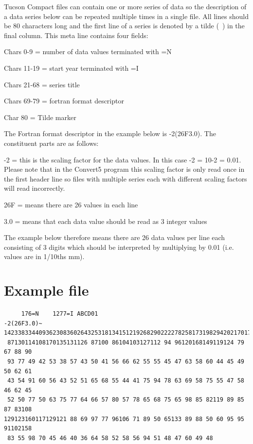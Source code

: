 Tucson Compact files can contain one or more series of data so the description of a data series below can be repeated multiple times in a single file. All lines should be 80 characters long and the first line of a series is denoted by a tilde (~) in the final column. This meta line contains four fields:

\begin{itemize*}
    \item  Chars 0-9 = number of data values terminated with =N
    \item  Chars 11-19 = start year terminated with =I
    \item  Chars 21-68 = series title
    \item  Chars 69-79 = fortran format descriptor
    \item  Char 80 = Tilde marker 
\end{itemize*}

The Fortran format descriptor in the example below is -2(26F3.0). The constituent parts are as follows:

\begin{itemize*}
    \item  -2 = this is the scaling factor for the data values. In this case -2 = 10-2 = 0.01. Please note that in the Convert5 program this scaling factor is only read once in the first header line so files with multiple series each with different scaling factors will read incorrectly. 
    \item  26F = means there are 26 values in each line
    \item  3.0 = means that each data value should be read as 3 integer values 
\end{itemize*}

The example below therefore means there are 26 data values per line each consisting of 3 digits which should be interpreted by multiplying by 0.01 (i.e. values are in 1/10ths mm). 


\section{Example file}
\begin{lstlisting}
     176=N    1277=I ABCD01                                          -2(26F3.0)~
142338334409362308360264325318134151219268290222278258173198294202170176172121
 87130114108170135131126 87100 86104103127112 94 96120168149119124 79 67 88 90
 93 77 49 42 53 38 57 43 50 41 56 66 62 55 55 45 47 63 58 60 44 45 49 50 62 61
 43 54 91 60 56 43 52 51 65 68 55 44 41 75 94 78 63 69 58 75 55 47 58 46 62 45
 52 50 77 50 63 75 77 64 66 57 80 57 78 65 68 75 65 98 85 82119 89 85 87 83108
129123160117129121 88 69 97 77 96106 71 89 50 65133 89 88 50 60 95 95 91102158
 83 55 98 70 45 46 40 36 64 58 52 58 56 94 51 48 47 60 49 48
\end{lstlisting}



